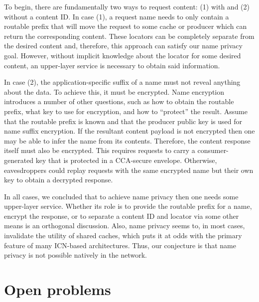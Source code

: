\documentclass[a4paper,UKenglish]{dagrep}
\begin{document}
To begin, there are fundamentally two ways to request content: (1) with and (2) without a content ID. In case (1), a request name needs to only contain a routable prefix that will move the request to some cache or producer which can return the corresponding content. These locators can be completely separate from the desired content and, therefore, this approach can satisfy our name privacy goal. However, without implicit knowledge about the locator for some desired content, an upper-layer service is necessary to obtain said information.

In case (2), the application-specific suffix of a name must not reveal anything about the data. To achieve this, it must be encrypted. Name encryption introduces a number of other questions, such as how to obtain the routable prefix, what key to use for encryption, and how to ``protect'' the result. Assume that the routable prefix is known and that the producer public key is used for name suffix encryption. If the resultant content payload is not encrypted then one may be able to infer the name from its contents. Therefore, the content response itself must also be encrypted. This requires requests to carry a consumer-generated key that is protected in a CCA-secure envelope. Otherwise, eavesdroppers could replay requests with the same encrypted name but their own key to obtain a decrypted response.

In all cases, we concluded that to achieve name privacy then one needs some upper-layer service. Whether its role is to provide the routable prefix for a name, encrypt the response, or to separate a content ID and locator via some other means is an orthogonal discussion. Also, name privacy seems to, in most cases, invalidate the utility of shared caches, which puts it at odds with the primary feature of many ICN-based architectures. Thus, our conjecture is that name privacy is not possible natively in the network.





\section{Open problems}
\end{document}
